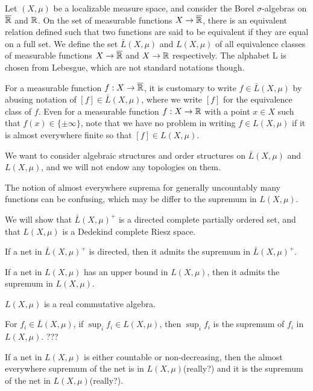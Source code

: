 \documentclass{../../large}
\begin{document}
\begin{prb}
Let $(X,\mu)$ be a localizable measure space, and consider the Borel $\sigma$-algebras on $\overline{\mathbb{R}}$ and $\mathbb{R}$.
On the set of measurable functions $X\to\overline{\mathbb{R}}$, there is an equivalent relation defined such that two functions are said to be equivalent if they are equal on a full set.
We define the set $\bar L(X,\mu)$ and $L(X,\mu)$ of all equivalence classes of measurable functions $X\to\overline{\mathbb{R}}$ and $X\to\mathbb{R}$ respectively.
The alphabet L is chosen from Lebesgue, which are not standard notations though.

For a measurable function $f:X\to\overline{\mathbb{R}}$, it is customary to write $f\in\bar L(X,\mu)$ by abusing notation of $[f]\in\bar L(X,\mu)$, where we write $[f]$ for the equivalence class of $f$.
Even for a measurable function $f:X\to\mathbb{R}$ with a point $x\in X$ such that $f(x)\in\{\pm\infty\}$, note that we have no problem in writing $f\in L(X,\mu)$ if it is almost everywhere finite so that $[f]\in L(X,\mu)$.




We want to consider algebraic structures and order structures on $\bar L(X,\mu)$ and $L(X,\mu)$, and we will not endow any topologies on them.


The notion of almost everywhere suprema for generally uncountably many functions can be confusing, which may be differ to the supremum in $L(X,\mu)$.



We will show that $\bar L(X,\mu)^+$ is a directed complete partially ordered set, and that $L(X,\mu)$ is a Dedekind complete Riesz space.
\begin{parts}
\item
If a net in $\bar L(X,\mu)^+$ is directed, then it admits the supremum in $\bar L(X,\mu)^+$.
\item
If a net in $L(X,\mu)$ has an upper bound in $L(X,\mu)$, then it admits the supremum in $L(X,\mu)$.
\item
$L(X,\mu)$ is a real commutative algebra.
\item
For $f_i\in\bar L(X,\mu)$, if $\sup_if_i\in L(X,\mu)$, then $\sup_if_i$ is the supremum of $f_i$ in $L(X,\mu)$. ???
\item
If a net in $L(X,\mu)$ is either countable or non-decreasing, then the almost everywhere supremum of the net is in $L(X,\mu)$(really?) and it is the supremum of the net in $L(X,\mu)$(really?).
\end{parts}
\end{prb}
\end{document}
